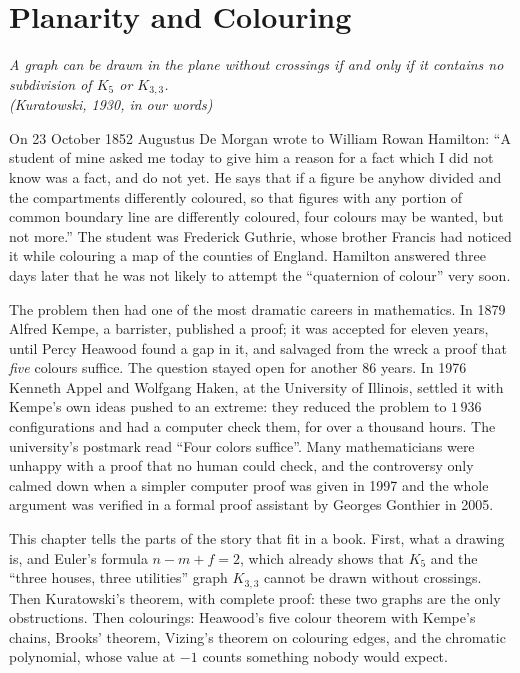 \chapter{Planarity and Colouring}

\begin{center}\itshape
A graph can be drawn in the plane without crossings if and only if it contains no subdivision of $K_5$ or $K_{3,3}$.\\
\upshape(Kuratowski, 1930, in our words)
\end{center}

On 23 October 1852 Augustus De Morgan wrote to William Rowan Hamilton: ``A student of mine asked me today to give him a
reason for a fact which I did not know was a fact, and do not yet. He says that if a figure be anyhow divided and the
compartments differently coloured, so that figures with any portion of common boundary line are differently coloured, four
colours may be wanted, but not more.'' The student was Frederick Guthrie, whose brother Francis had noticed it while colouring
a map of the counties of England. Hamilton answered three days later that he was not likely to attempt the ``quaternion of colour''
very soon.

The problem then had one of the most dramatic careers in mathematics. In 1879 Alfred Kempe, a barrister, published a proof;
it was accepted for eleven years, until Percy Heawood found a gap in it, and salvaged from the wreck a proof that \emph{five} colours
suffice. The question stayed open for another 86 years. In 1976 Kenneth Appel and Wolfgang Haken, at the University of
Illinois, settled it with Kempe's own ideas pushed to an extreme: they reduced the problem to $1\,936$ configurations and had a
computer check them, for over a thousand hours. The university's postmark read ``Four colors suffice''. Many mathematicians
were unhappy with a proof that no human could check, and the controversy only calmed down when a simpler computer proof was given
in 1997 and the whole argument was verified in a formal proof assistant by Georges Gonthier in 2005.

This chapter tells the parts of the story that fit in a book. First, what a drawing is, and Euler's formula $n-m+f=2$, which
already shows that $K_5$ and the ``three houses, three utilities'' graph $K_{3,3}$ cannot be drawn without crossings. Then
Kuratowski's theorem, with complete proof: these two graphs are the only obstructions. Then colourings: Heawood's five colour
theorem with Kempe's chains, Brooks' theorem, Vizing's theorem on colouring edges, and the chromatic polynomial, whose value
at $-1$ counts something nobody would expect.

